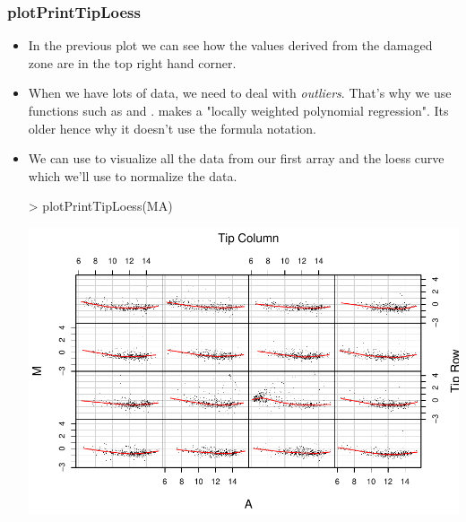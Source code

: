 \begin{frame}
  \frametitle{plotPrintTipLoess}
  \begin{itemize}
  \item In the previous plot we can see how the values derived from the damaged zone are in the top right hand corner.
  \item When we have lots of data, we need to deal with \emph{outliers}. That's why we use functions such as  and .  makes a "locally weighted polynomial regression". Its older hence why it doesn't use the formula notation.
  \item We can use  to visualize all the data from our first array and the loess curve which we'll use to normalize the data.
\begin{Schunk}
\begin{Sinput}
> plotPrintTipLoess(MA)
\end{Sinput}
\end{Schunk}
\includegraphics{plots/fig-024}
  \end{itemize}
\end{frame}

